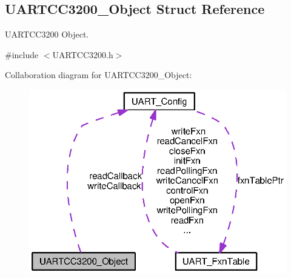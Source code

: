 \subsection{U\-A\-R\-T\-C\-C3200\-\_\-\-Object Struct Reference}
\label{struct_u_a_r_t_c_c3200___object}


U\-A\-R\-T\-C\-C3200 Object.  




{\ttfamily \#include $<$U\-A\-R\-T\-C\-C3200.\-h$>$}



Collaboration diagram for U\-A\-R\-T\-C\-C3200\-\_\-\-Object\-:
\nopagebreak
\begin{figure}[H]
\begin{center}
\leavevmode
\includegraphics[width=322pt]{struct_u_a_r_t_c_c3200___object__coll__graph}
\end{center}
\end{figure}
